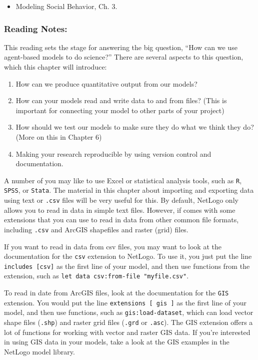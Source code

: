 \documentclass[
]{article}
\providecommand{\tightlist}{%
  \setlength{\itemsep}{0pt}\setlength{\parskip}{0pt}}
\begin{document}
\begin{itemize}
\tightlist
\item
  Modeling Social Behavior, Ch. 3.
\end{itemize}

\subsubsection{Reading Notes:}\label{reading-notes-4}

This reading sets the stage for answering the big question, ``How can we
use agent-based models to do science?'' There are several aspects to
this question, which this chapter will introduce:

\begin{enumerate}
\def\labelenumi{\arabic{enumi}.}
\tightlist
\item
  How can we produce quantitative output from our models?
\item
  How can your models read and write data to and from files? (This is
  important for connecting your model to other parts of your project)
\item
  How should we test our models to make sure they do what we think they
  do? (More on this in Chapter 6)
\item
  Making your research reproducible by using version control and
  documentation.
\end{enumerate}

A number of you may like to use Excel or statistical analysis tools,
such as \texttt{R}, \texttt{SPSS}, or \texttt{Stata}. The material in
this chapter about importing and exporting data using text or
\texttt{.csv} files will be very useful for this. By default, NetLogo
only allows you to read in data in simple text files. However, if comes
with some extensions that you can use to read in data from other common
file formats, including \texttt{.csv} and ArcGIS shapefiles and raster
(grid) files.

If you want to read in data from csv files, you may want to look at the
documentation for the \texttt{csv} extension to NetLogo. To use it, you
just put the line \texttt{includes\ {[}csv{]}} as the first line of your
model, and then use functions from the extension, such as
\texttt{let\ data\ csv:from-file\ "myfile.csv"}.

To read in date from ArcGIS files, look at the documentation for the
\texttt{GIS} extension. You would put the line
\texttt{extensions\ {[}\ gis\ {]}} as the first line of your model, and
then use functions, such as \texttt{gis:load-dataset}, which can load
vector shape files (\texttt{.shp}) and raster grid files (\texttt{.grd}
or \texttt{.asc}). The GIS extension offers a lot of functions for
working with vector and raster GIS data. If you're interested in using
GIS data in your models, take a look at the GIS examples in the NetLogo
model library.
\end{document}
